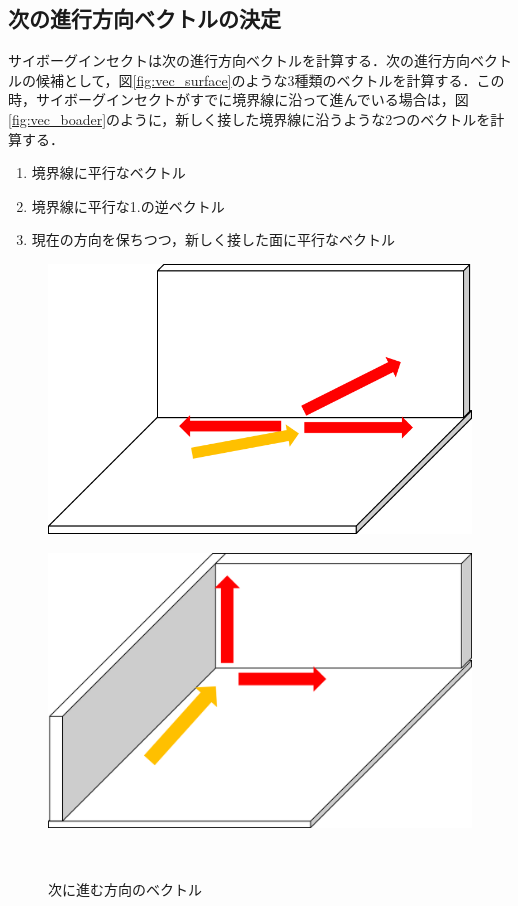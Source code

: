 \documentclass[a4paper,11pt]{jarticle}
\begin{document}
	\subsection{次の進行方向ベクトルの決定}
	\label{vector}
	サイボーグインセクトは次の進行方向ベクトルを計算する．次の進行方向ベクトルの候補として，図\ref{fig:vec_surface}のような3種類のベクトルを計算する．この時，サイボーグインセクトがすでに境界線に沿って進んでいる場合は，図\ref{fig:vec_boader}のように，新しく接した境界線に沿うような2つのベクトルを計算する．
	\begin{enumerate}
		\item 境界線に平行なベクトル
		\item 境界線に平行な1.の逆ベクトル
		\item 現在の方向を保ちつつ，新しく接した面に平行なベクトル
	\end{enumerate}
	\begin{figure}
		\begin{minipage}{0.5\linewidth}
			\centering
			\includegraphics[width=1\linewidth]{png/vector.png}
			\label{fig:vec_surface}
		\end{minipage}
		\begin{minipage}{0.5\linewidth}
			\centering
			\includegraphics[width=1\linewidth]{png/vector2.png}
			\label{fig:vec_boader}
		\end{minipage}\\
		\caption{次に進む方向のベクトル}
		\label{fig:vector}
	\end{figure}
	
\end{document}

